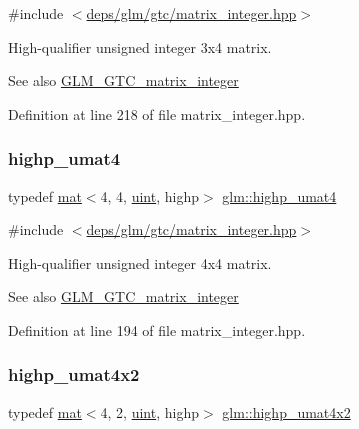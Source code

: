 {\ttfamily \#include $<$\hyperlink{matrix__integer_8hpp}{deps/glm/gtc/matrix\+\_\+integer.\+hpp}$>$}

High-\/qualifier unsigned integer 3x4 matrix. \begin{DoxySeeAlso}{See also}
\hyperlink{group__gtc__matrix__integer}{G\+L\+M\+\_\+\+G\+T\+C\+\_\+matrix\+\_\+integer} 
\end{DoxySeeAlso}


Definition at line 218 of file matrix\+\_\+integer.\+hpp.

\mbox{\label{group__gtc__matrix__integer_ga9bc7b9ba044449b412119fa68cf11b20}} 
\subsubsection{\texorpdfstring{highp\+\_\+umat4}{highp\_umat4}}
{\footnotesize\ttfamily typedef \hyperlink{structglm_1_1mat}{mat}$<$4, 4, \hyperlink{group__core__precision_ga4fd29415871152bfb5abd588334147c8}{uint}, highp$>$ \hyperlink{group__gtc__matrix__integer_ga9bc7b9ba044449b412119fa68cf11b20}{glm\+::highp\+\_\+umat4}}



{\ttfamily \#include $<$\hyperlink{matrix__integer_8hpp}{deps/glm/gtc/matrix\+\_\+integer.\+hpp}$>$}

High-\/qualifier unsigned integer 4x4 matrix. \begin{DoxySeeAlso}{See also}
\hyperlink{group__gtc__matrix__integer}{G\+L\+M\+\_\+\+G\+T\+C\+\_\+matrix\+\_\+integer} 
\end{DoxySeeAlso}


Definition at line 194 of file matrix\+\_\+integer.\+hpp.

\mbox{\label{group__gtc__matrix__integer_gaf56fa20818ea9c18fd0a4a8bf141a738}} 
\subsubsection{\texorpdfstring{highp\+\_\+umat4x2}{highp\_umat4x2}}
{\footnotesize\ttfamily typedef \hyperlink{structglm_1_1mat}{mat}$<$4, 2, \hyperlink{group__core__precision_ga4fd29415871152bfb5abd588334147c8}{uint}, highp$>$ \hyperlink{group__gtc__matrix__integer_gaf56fa20818ea9c18fd0a4a8bf141a738}{glm\+::highp\+\_\+umat4x2}}



